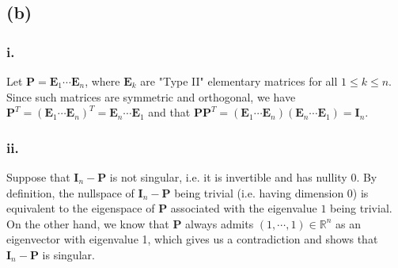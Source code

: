 \documentclass{article}
\begin{document}
\subsection*{(b)}
\subsubsection*{i.}
Let $\mathbf{P} = \mathbf{E}_1 \cdots \mathbf{E}_n$, where $\mathbf{E}_k$ are "Type II" elementary matrices for all $1 \leq k \leq n$. Since such matrices are symmetric and orthogonal, we have $\mathbf{P}^T = (\mathbf{E}_1 \cdots \mathbf{E}_n)^T = \mathbf{E}_n \cdots \mathbf{E}_1$ and that $\mathbf{P}\mathbf{P}^T = (\mathbf{E}_1 \cdots \mathbf{E}_n)(\mathbf{E}_n \cdots \mathbf{E}_1) = \mathbf{I}_n$.
\subsubsection*{ii.}
Suppose that $\mathbf{I}_n - \mathbf{P}$ is not singular, i.e. it is invertible and has nullity $0$. By definition, the nullspace of  $\mathbf{I}_n - \mathbf{P}$ being trivial (i.e. having dimension 0) is equivalent to the eigenspace of $\mathbf{P}$ associated with the eigenvalue $1$ being trivial. On the other hand, we know that $\mathbf{P}$ always admits $(1, \cdots ,1) \in \mathbb{R}^n$ as an eigenvector with eigenvalue 1, which gives us a contradiction and shows that $\mathbf{I}_n - \mathbf{P}$ is singular.
\end{document}
